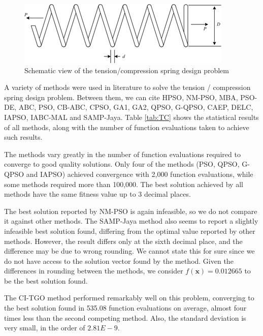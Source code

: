 \begin{figure}[h]
\begin{center}
\includegraphics[scale=0.6]{Imgs/TC.png}
\end{center}
\captionsetup{justification=centering}
\caption{Schematic view of the tension/compression spring design problem}\label{fig:TC}
\end{figure}


A variety of methods were used in literature to solve the tension / compression spring design problem. Between them, we can cite HPSO, NM-PSO, MBA, PSO-DE, ABC, PSO, CB-ABC, CPSO, GA1, GA2, QPSO, G-QPSO, CAEP, DELC, IAPSO, IABC-MAL and SAMP-Jaya. Table \ref{tab:TC} shows the statistical results of all methods, along with the number of function evaluations taken to achieve such results.




The methods vary greatly in the number of function evaluations required to converge to good quality solutions. Only four of the methods (PSO, QPSO, G-QPSO and IAPSO) achieved convergence with 2,000 function evaluations, while some methods required more than 100,000. The best solution achieved by all methods have the same fitness value up to 3 decimal places.
 
The best solution reported by NM-PSO is again infeasible, so we do not compare it against other methods. The SAMP-Jaya method also seems to report a slightly infeasible best solution found, differing from the optimal value reported by other methods. However, the result differs only at the sixth decimal place, and the difference may be due to wrong rounding. We cannot state this for sure since we do not have access to the solution vector found by the method. Given the differences in rounding between the methods, we consider $f(\bm{x}) = 0.012665$ to be the best solution found.

The CI-TGO method performed remarkably well on this problem, converging to the best solution found in 535.08 function evaluations on average, almost four times less than the second competing method. Also, the standard deviation is very small, in the order of $2.81E-9$. 

